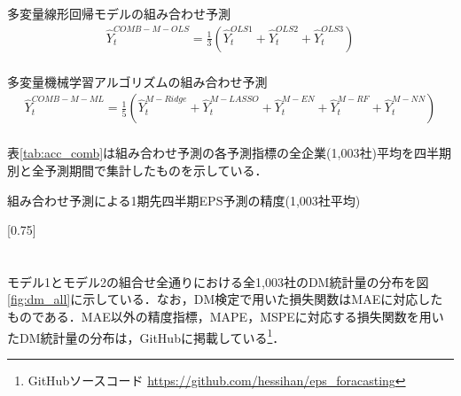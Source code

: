 \documentclass[a4paper，11pt]{jsarticle}
\begin{document}
多変量線形回帰モデルの組み合わせ予測
\begin{equation}
\begin{split}  
\hat{Y}_t^{COMB-M-OLS} = \frac{1}{3} \left( \hat{Y}_t^{OLS1} + \hat{Y}_t^{OLS2} + \hat{Y}_t^{OLS3} \right) \\
\end{split}
\end{equation}

多変量機械学習アルゴリズムの組み合わせ予測
\begin{equation}
\begin{split}  
\hat{Y}_t^{COMB-M-ML} = \frac{1}{5} \left( \hat{Y}_t^{M-Ridge} + \hat{Y}_t^{M-LASSO} + \hat{Y}_t^{M-EN} + \hat{Y}_t^{M-RF} + \hat{Y}_t^{M-NN} \right) \\
\end{split}
\end{equation}

\noindent
表\ref{tab:acc_comb}は組み合わせ予測の各予測指標の全企業(1,003社)平均を四半期別と全予測期間で集計したものを示している．

\begin{landscape}
\begin{table}[tbp]
  \caption{組み合わせ予測による1期先四半期EPS予測の精度(1,003社平均)}
  \label{tab:acc_comb}
  \scalebox{0.75}[0.75]{
    
  }
\end{table}
\end{landscape}

\newpage
\section{} \label{app:dm}
モデル1とモデル2の組合せ全通りにおける全1,003社のDM統計量の分布を図\ref{fig:dm_all}に示している．なお，DM検定で用いた損失関数はMAEに対応したものである．MAE以外の精度指標，MAPE，MSPEに対応する損失関数を用いたDM統計量の分布は，GitHubに掲載している\footnote{GitHubソースコード \url{https://github.com/hessihan/eps_foracasting}}．
\end{document}
